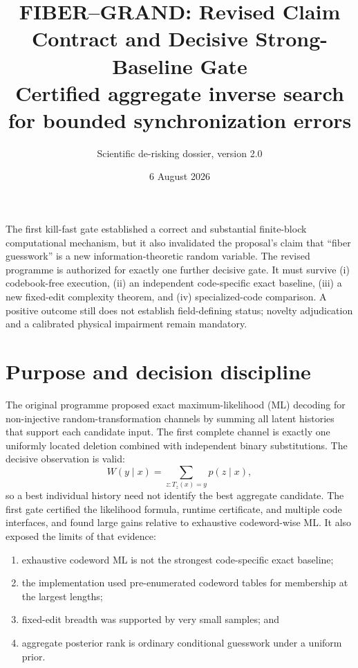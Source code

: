 \documentclass[11pt]{article}
\title{\textbf{FIBER--GRAND: Revised Claim Contract and Decisive Strong-Baseline Gate}\\[2mm]
\large Certified aggregate inverse search for bounded synchronization errors}
\author{Scientific de-risking dossier, version 2.0}
\date{6 August 2026}
\theoremstyle{definition}
\theoremstyle{remark}
\begin{document}
\maketitle

\begin{tcolorbox}[colback=blue!4,colframe=blue!55!black,title=Scientific status]
The first kill-fast gate established a correct and substantial finite-block computational mechanism, but it also invalidated the proposal's claim that ``fiber guesswork'' is a new information-theoretic random variable.  The revised programme is authorized for exactly one further decisive gate.  It must survive (i) codebook-free execution, (ii) an independent code-specific exact baseline, (iii) a new fixed-edit complexity theorem, and (iv) specialized-code comparison.  A positive outcome still does not establish field-defining status; novelty adjudication and a calibrated physical impairment remain mandatory.
\end{tcolorbox}

\tableofcontents
\newpage

\section{Purpose and decision discipline}
The original programme proposed exact maximum-likelihood (ML) decoding for non-injective random-transformation channels by summing all latent histories that support each candidate input.  The first complete channel is exactly one uniformly located deletion combined with independent binary substitutions.  The decisive observation is valid:
\[
  W(y\mid x)=\sum_{z:T_z(x)=y}p(z\mid x),
\]
so a best individual history need not identify the best aggregate candidate.  The first gate certified the likelihood formula, runtime certificate, and multiple code interfaces, and found large gains relative to exhaustive codeword-wise ML.  It also exposed the limits of that evidence:
\begin{enumerate}[label=(\alph*),leftmargin=2em]
\item exhaustive codeword ML is not the strongest code-specific exact baseline;
\item the implementation used pre-enumerated codeword tables for membership at the largest lengths;
\item fixed-edit breadth was supported by very small samples; and
\item aggregate posterior rank is ordinary conditional guesswork under a uniform prior.
\end{enumerate}
\end{document}
